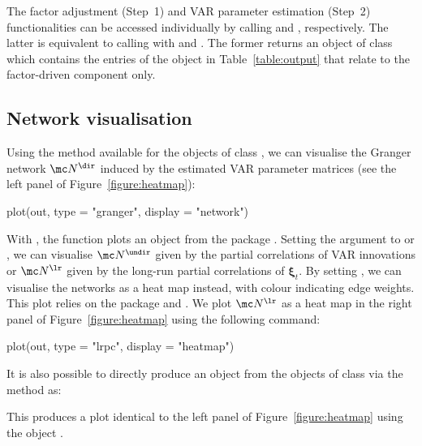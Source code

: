 The factor adjustment (Step~1) and VAR parameter estimation (Step~2) functionalities can be accessed individually by calling   and , respectively.
The latter is equivalent to calling  with  and .
The former returns an object of class  which contains the entries of the  object in Table~\ref{table:output} that relate to the factor-driven component only.

\subsection{Network visualisation}
\label{sec:ex:network}

Using the  method available for the objects of class , we can visualise the Granger network $\mc N^{\dir}$ induced by the estimated VAR parameter matrices (see the left panel of Figure~\ref{figure:heatmap}): 
\begin{example}
plot(out, type = "granger", display = "network")
\end{example}
With , the function plots an  object from the  package \citep{igraph}.
Setting the argument  to  or , we can visualise $\mc N^{\undir}$ given by the partial correlations of VAR innovations or $\mc N^{\lr}$ given by the long-run partial correlations of $\bm\xi_t$.
By setting , we can visualise the networks as a heat map instead, with colour indicating edge weights.
This plot relies on the  package \citep{fields} and  \citep{RColorBrewer}.
We plot $\mc N^{\lr}$ as a heat map in the right panel of Figure~\ref{figure:heatmap} using the following command:
\begin{example}
plot(out, type = "lrpc", display = "heatmap")
\end{example}
It is also possible to directly produce an  object from the objects of class  via the  method as: 
This produces a plot identical to the left panel of Figure~\ref{figure:heatmap} using the  object .

